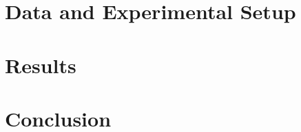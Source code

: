 \documentclass[preprint,12pt,authoryear,nonatbib]{elsarticle}
\begin{document}
\section{Data and Experimental Setup}\label{sec:dataset}


\section{Results}\label{sec:evaluation}


\section{Conclusion}\label{sec:conclusion}




\FloatBarrier
\printbibliography
\end{document}
